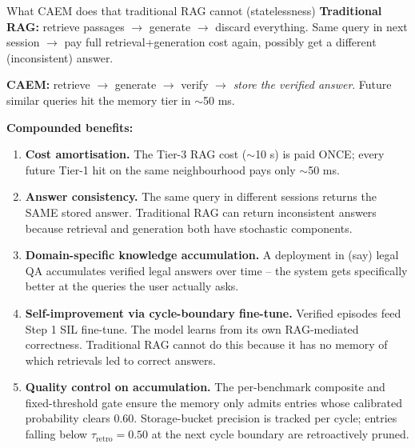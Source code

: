 \documentclass[10pt,aspectratio=169]{beamer}
\begin{document}
\begin{frame}{What CAEM does that traditional RAG cannot (statelessness)}
  \footnotesize
  \textbf{Traditional RAG:} retrieve passages $\to$ generate $\to$ \alert{discard everything}. Same query in next session $\to$ pay full retrieval+generation cost again, possibly get a different (inconsistent) answer.

  \vspace{0.5em}
  \textbf{CAEM:} retrieve $\to$ generate $\to$ verify $\to$ \emph{store the verified answer}. Future similar queries hit the memory tier in $\sim$50 ms.

  \vspace{0.5em}
  \textbf{Compounded benefits:}
  \begin{enumerate}\small
    \item \textbf{Cost amortisation.} The Tier-3 RAG cost ($\sim$10 s) is paid ONCE; every future Tier-1 hit on the same neighbourhood pays only $\sim$50 ms.
    \item \textbf{Answer consistency.} The same query in different sessions returns the SAME stored answer. Traditional RAG can return inconsistent answers because retrieval and generation both have stochastic components.
    \item \textbf{Domain-specific knowledge accumulation.} A deployment in (say) legal QA accumulates verified legal answers over time -- the system gets specifically better at the queries the user actually asks.
    \item \textbf{Self-improvement via cycle-boundary fine-tune.} Verified episodes feed Step 1 SIL fine-tune. The model learns from its own RAG-mediated correctness. Traditional RAG cannot do this because it has no memory of which retrievals led to correct answers.
    \item \textbf{Quality control on accumulation.} The per-benchmark composite and fixed-threshold gate ensure the memory only admits entries whose calibrated probability clears $0.60$. Storage-bucket precision is tracked per cycle; entries falling below $\tau_{\text{retro}}=0.50$ at the next cycle boundary are retroactively pruned.
  \end{enumerate}
\end{frame}
\end{document}

